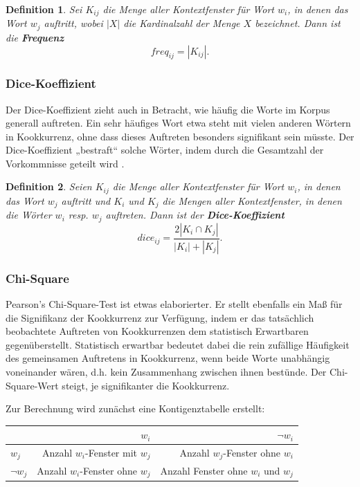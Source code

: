 \documentclass[11pt,numbers=noenddot]{scrartcl}
\newtheorem*{defi}{Definition}
\begin{document}
\begin{defi}
Sei $K_{ij}$ die Menge aller Kontextfenster für Wort $w_i$, in denen das Wort $w_j$ auftritt, wobei $|X|$ die Kardinalzahl der Menge $X$ bezeichnet. Dann ist die \textbf{Frequenz}
\begin{equation*}
   freq_{ij} = |K_{ij}|.
\end{equation*}
\end{defi}

\subsubsection{Dice-Koeffizient}

Der Dice-Koeffizient zieht auch in Betracht, wie häufig die Worte im Korpus generall auftreten. Ein sehr häufiges Wort etwa steht mit vielen anderen Wörtern in Kookkurrenz, ohne dass dieses Auftreten besonders signifikant sein müsste. Der Dice-Koeffizient „bestraft“ solche Wörter, indem durch die Gesamtzahl der Vorkommnisse geteilt wird \citep[S. 299]{manning1999}.

\begin{defi}
Seien $K_{ij}$ die Menge aller Kontextfenster für Wort $w_i$, in denen das Wort $w_j$ auftritt und $K_{i}$ und $K_{j}$ die Mengen aller Kontextfenster, in denen die Wörter $w_i$ resp. $w_j$ auftreten. Dann ist der \textbf{Dice-Koeffizient}
\begin{equation*}
   dice_{ij} = \frac{2 |K_{i} \cap K_{j}| }{|K_{i}| + |K_{j}|}.
\end{equation*}
\end{defi}

\subsubsection{Chi-Square}

Pearson's Chi-Square-Test ist etwas elaborierter. Er stellt ebenfalls ein Maß für die Signifikanz der Kookkurrenz zur Verfügung, indem er das tatsächlich beobachtete Auftreten von Kookkurrenzen dem statistisch Erwartbaren gegenüberstellt. Statistisch erwartbar bedeutet dabei die rein zufällige Häufigkeit des gemeinsamen Auftretens in Kookkurrenz, wenn beide Worte unabhängig voneinander wären, d.h. kein Zusammenhang zwischen ihnen bestünde. Der Chi-Square-Wert steigt, je signifikanter die Kookkurrenz.

Zur Berechnung wird zunächst eine Kontigenztabelle erstellt:
\begin{table}[h]
    \begin{center}
        \begin{tabular}{l|r|r}
                    & $w_i$ & $\neg w_i$ \\ \hline
            $w_j$ &  Anzahl $w_i$-Fenster mit $w_j$ & Anzahl $w_j$-Fenster ohne $w_i$\\ \hline
            $\neg w_j$ &  Anzahl $w_i$-Fenster ohne $w_j$ & Anzahl Fenster ohne $w_i$ und $w_j$
        \end{tabular}
    \end{center}
\end{table}
\end{document}
